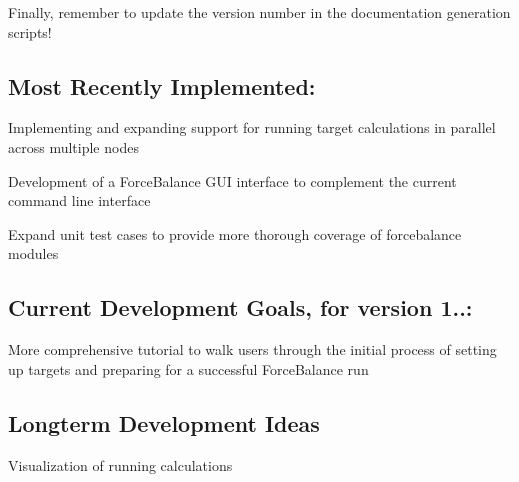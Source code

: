 \-Finally, remember to update the version number in the documentation generation scripts!\hypertarget{roadmap_recent}{}\subsection{\-Most Recently Implemented\-:}\label{roadmap_recent}
\begin{DoxyItemize}
\item \-Implementing and expanding support for running target calculations in parallel across multiple nodes \item \-Development of a \-Force\-Balance \-G\-U\-I interface to complement the current command line interface \item \-Expand unit test cases to provide more thorough coverage of forcebalance modules\end{DoxyItemize}
\hypertarget{roadmap_current}{}\subsection{\-Current Development Goals, for version 1..\-:}\label{roadmap_current}
\begin{DoxyItemize}
\item \-More comprehensive tutorial to walk users through the initial process of setting up targets and preparing for a successful \-Force\-Balance run\end{DoxyItemize}
\hypertarget{roadmap_longterm}{}\subsection{\-Longterm Development Ideas}\label{roadmap_longterm}
\begin{DoxyItemize}
\item \-Visualization of running calculations \end{DoxyItemize}
